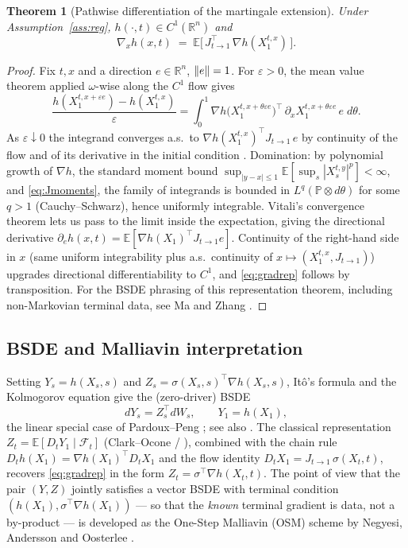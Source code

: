 \documentclass[11pt]{article}
\newtheorem{theorem}{Theorem}[section]
\theoremstyle{definition}
\theoremstyle{remark}
\newcommand{\R}{\mathbb{R}}
\newcommand{\E}{\mathbb{E}}
\newcommand{\Pmeas}{\mathbb{P}}
\newcommand{\F}{\mathcal{F}}
\newcommand{\grad}{\nabla}
\DeclarePairedDelimiter{\norm}{\lVert}{\rVert}
\begin{document}
\begin{theorem}[Pathwise differentiation of the martingale extension]\label{thm:pathwise}
Under Assumption~\ref{ass:reg}, $h(\cdot,t)\in C^1(\R^n)$ and
\begin{equation}\label{eq:gradrep}
\grad_x h(x,t) \;=\; \E\big[\, J_{t\to 1}^\top \,\grad h(X^{t,x}_1)\,\big].
\end{equation}
\end{theorem}

\begin{proof}
Fix $t,x$ and a direction $e\in\R^n$, $\norm{e}=1$. For $\varepsilon>0$, the mean value
theorem applied $\omega$-wise along the $C^1$ flow gives
\[
\frac{h(X^{t,x+\varepsilon e}_1) - h(X^{t,x}_1)}{\varepsilon}
= \int_0^1 \grad h\big(X^{t,x+\theta\varepsilon e}_1\big)^\top
\,\partial_x X^{t,x+\theta\varepsilon e}_1\, e \; d\theta .
\]
As $\varepsilon\downarrow 0$ the integrand converges a.s.\ to
$\grad h(X^{t,x}_1)^\top J_{t\to1}\,e$ by continuity of the flow and of its derivative in the
initial condition \cite[Thm.~4.6.5]{Kunita}. Domination: by polynomial growth of $\grad h$,
the standard moment bound $\sup_{|y-x|\le 1}\E[\sup_s |X^{t,y}_s|^p]<\infty$, and
\eqref{eq:Jmoments}, the family of integrands is bounded in $L^q(\Pmeas\otimes d\theta)$ for
some $q>1$ (Cauchy--Schwarz), hence uniformly integrable. Vitali's convergence theorem lets
us pass to the limit inside the expectation, giving the directional derivative
$\partial_e h(x,t) = \E[\grad h(X_1)^\top J_{t\to1} e]$. Continuity of the right-hand side in
$x$ (same uniform integrability plus a.s.\ continuity of $x\mapsto (X^{t,x}_1, J_{t\to1})$)
upgrades directional differentiability to $C^1$, and \eqref{eq:gradrep} follows by
transposition. For the BSDE phrasing of this representation theorem, including
non-Markovian terminal data, see Ma and Zhang \cite{MaZhang}.
\end{proof}

\subsection{BSDE and Malliavin interpretation}

Setting $Y_s = h(X_s,s)$ and $Z_s = \sigma(X_s,s)^\top \grad h(X_s,s)$, It\^o's formula and
the Kolmogorov equation give the (zero-driver) BSDE
\begin{equation}\label{eq:bsde0}
dY_s = Z_s^\top dW_s,\qquad Y_1 = h(X_1),
\end{equation}
the linear special case of Pardoux--Peng \cite{PardouxPeng}; see also
\cite{ElKarouiPengQuenez}. The classical representation $Z_t = \E[D_t Y_1 \mid \F_t]$
(Clark--Ocone / \cite{ElKarouiPengQuenez,MaZhang}), combined with the chain rule
$D_t h(X_1) = \grad h(X_1)^\top D_t X_1$ and the flow identity
$D_t X_1 = J_{t\to 1}\,\sigma(X_t,t)$, recovers \eqref{eq:gradrep} in the form
$Z_t = \sigma^\top \grad h(X_t,t)$. The point of view that the pair $(Y,Z)$ jointly satisfies
a vector BSDE with terminal condition $(h(X_1), \sigma^\top\grad h(X_1))$ --- so that the
\emph{known} terminal gradient is data, not a by-product --- is developed as the One-Step
Malliavin (OSM) scheme by Negyesi, Andersson and Oosterlee \cite{OSM}.
\end{document}
